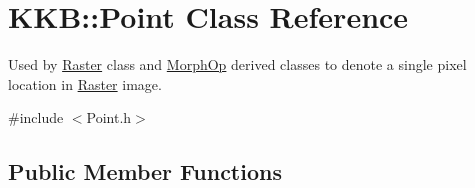 \hypertarget{class_k_k_b_1_1_point}{}\section{K\+KB\+:\+:Point Class Reference}
\label{class_k_k_b_1_1_point}


Used by \hyperlink{class_k_k_b_1_1_raster}{Raster} class and \hyperlink{class_k_k_b_1_1_morph_op}{Morph\+Op} derived classes to denote a single pixel location in \hyperlink{class_k_k_b_1_1_raster}{Raster} image.  




{\ttfamily \#include $<$Point.\+h$>$}

\subsection*{Public Member Functions}
